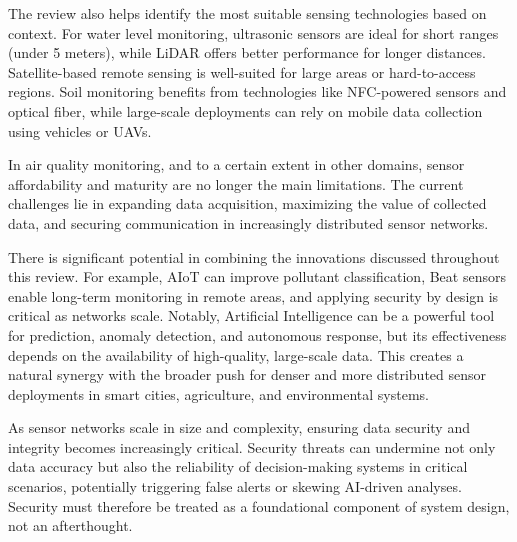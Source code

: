\documentclass[conference]{IEEEtran}
\begin{document}
The review also helps identify the most suitable sensing technologies based on context. For water level monitoring, ultrasonic sensors are ideal for short ranges (under 5 meters), while LiDAR offers better performance for longer distances. Satellite-based remote sensing is well-suited for large areas or hard-to-access regions. Soil monitoring benefits from technologies like NFC-powered sensors and optical fiber, while large-scale deployments can rely on mobile data collection using vehicles or UAVs.

In air quality monitoring, and to a certain extent in other domains, sensor affordability and maturity are no longer the main limitations. The current challenges lie in expanding data acquisition, maximizing the value of collected data, and securing communication in increasingly distributed sensor networks.

There is significant potential in combining the innovations discussed throughout this review. For example, AIoT can improve pollutant classification, Beat sensors enable long-term monitoring in remote areas, and applying security by design is critical as networks scale. Notably, Artificial Intelligence can be a powerful tool for prediction, anomaly detection, and autonomous response, but its effectiveness depends on the availability of high-quality, large-scale data. This creates a natural synergy with the broader push for denser and more distributed sensor deployments in smart cities, agriculture, and environmental systems.

As sensor networks scale in size and complexity, ensuring data security and integrity becomes increasingly critical. Security threats can undermine not only data accuracy but also the reliability of decision-making systems in critical scenarios, potentially triggering false alerts or skewing AI-driven analyses. Security must therefore be treated as a foundational component of system design, not an afterthought.


\end{document}
